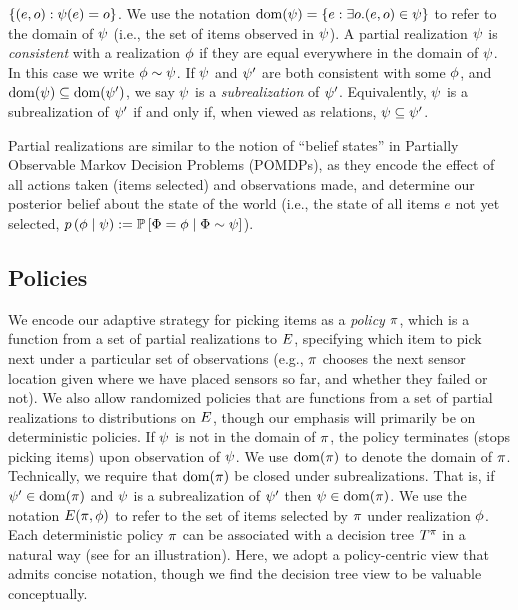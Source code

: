 $\left\{(e, o) : {\color{black}{\ensuremath{\psi}}}(e) = o \right\}$.
We use the notation $\operatorname{dom}({\color{black}{\ensuremath{\psi}}})=\left\{e: \exists o. (e,o)\in{\color{black}{\ensuremath{\psi}}}\right\}$ to refer to the domain of ${\color{black}{\ensuremath{\psi}}}$ (i.e., the set of items observed in ${\color{black}{\ensuremath{\psi}}}$).
A partial realization ${\color{black}{\ensuremath{\psi}}}$ is \emph{consistent}
with a realization ${\color{black}{\ensuremath{\phi}}}$ if they are equal everywhere in the domain
of ${\color{black}{\ensuremath{\psi}}}$.  
In this case we write ${\color{black}{\ensuremath{\phi}}}\sim{\color{black}{\ensuremath{\psi}}}$.  
If ${\color{black}{\ensuremath{\psi}}}$ and ${\color{black}{\ensuremath{\psi}}}'$ are both consistent with some ${\color{black}{\ensuremath{\phi}}}$, and 
$\operatorname{dom}({\color{black}{\ensuremath{\psi}}}) \subseteq \operatorname{dom}({\color{black}{\ensuremath{\psi}}}')$, we say ${\color{black}{\ensuremath{\psi}}}$ is a \emph{subrealization}
of ${\color{black}{\ensuremath{\psi}}}'$.  Equivalently, ${\color{black}{\ensuremath{\psi}}}$ is a subrealization
of ${\color{black}{\ensuremath{\psi}}}'$ if and only if, when viewed as relations, ${\color{black}{\ensuremath{\psi}}} \subseteq {\color{black}{\ensuremath{\psi}}}'$. 


Partial realizations are similar to the notion of ``belief states'' in
Partially Observable Markov Decision Problems (POMDPs), as they encode
the effect of all actions taken (items selected) and observations made, and determine our
posterior belief about the state of the world (i.e., the state of all
items $e$ not yet selected, ${\color{black}{\ensuremath{p \left( {{\color{black}{\ensuremath{\phi}}} \mid {\color{black}{\ensuremath{\psi}}} } \right) }}} := \mathbb{P}\left[{\color{black}{\ensuremath{\Phi}}} =
  {\color{black}{\ensuremath{\phi}}} \mid {\color{black}{\ensuremath{\Phi}}} \sim {\color{black}{\ensuremath{\psi}}}\right] $).

\subsection{Policies} We encode our adaptive strategy for picking items as a \emph{policy}
$\pi$, which is a function from a set of partial realizations to
$E$, specifying which item to pick next under a particular
set of observations (e.g., $\pi$ chooses the next sensor location
given where we have placed sensors so far, and whether they failed or
not). 
We also allow randomized policies that are functions 
from a set of partial realizations to distributions on $E$,
though our emphasis will primarily be on deterministic policies.
If ${\color{black}{\ensuremath{\psi}}}$ is not in the domain of $\pi$, the policy
terminates (stops picking items) upon observation of ${\color{black}{\ensuremath{\psi}}}$.
We use $\operatorname{dom}(\pi)$ to denote the domain of $\pi$.
Technically, we require that $\operatorname{dom}(\pi)$ be closed under
subrealizations.  That is, if ${\color{black}{\ensuremath{\psi}}}' \in \operatorname{dom}(\pi)$ and ${\color{black}{\ensuremath{\psi}}}$
is a subrealization of ${\color{black}{\ensuremath{\psi}}}'$ then ${\color{black}{\ensuremath{\psi}}} \in \operatorname{dom}(\pi)$.  
We use the notation $E({\pi}, {{\color{black}{\ensuremath{\phi}}}})$ to refer to the set of items selected by $\pi$ under realization ${\color{black}{\ensuremath{\phi}}}$.  Each deterministic policy $\pi$ can be associated with a decision
tree $T^{\pi}$ in a natural way (see  for
an illustration).  
Here, we adopt a policy-centric view that admits concise
notation, though we find the decision tree view to be valuable conceptually.

